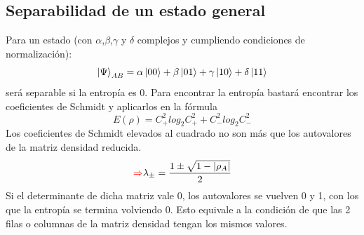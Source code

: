 \documentclass{book}
\begin{document}
\subsection{Separabilidad de un estado general} Para un estado (con $\alpha$,$\beta$,$\gamma$ y $\delta$ complejos y cumpliendo condiciones de normalización):
$$ \ket{\Psi}_{AB}=\alpha\ket{00}+\beta\ket{01}+\gamma\ket{10}+\delta\ket{11}$$ será separable si la entropía es 0. Para encontrar la entropía bastará encontrar los coeficientes de Schmidt y aplicarlos en la fórmula
$$ E(\rho)=C_+^2 log_2 C_+^2+C_-^2 log_2 C_-^2$$
Los coeficientes de Schmidt elevados al cuadrado no son más que los autovalores de la matriz densidad reducida.
$$\textcolor{red}{\Rightarrow}\lambda_\pm=\frac{1\pm\sqrt{1-\left|\rho_A\right|}}{2}$$ Si el determinante de dicha matriz vale 0, los autovalores se vuelven 0 y 1, con los que la entropía se termina volviendo 0. Esto equivale a la condición de que las 2 filas o columnas de la matriz densidad tengan los mismos valores. 
\end{document}
